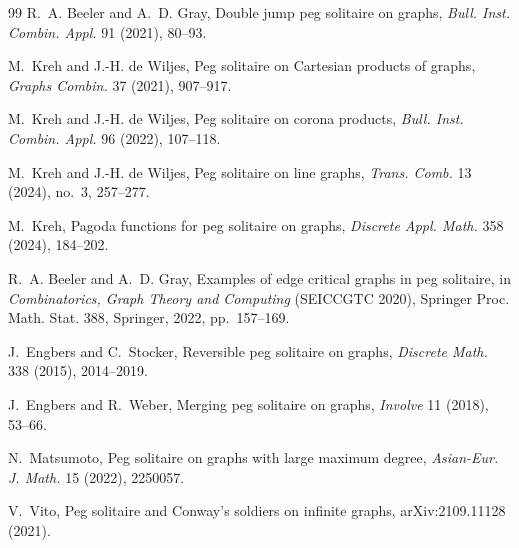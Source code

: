 \documentclass[11pt]{article}
\theoremstyle{definition}
\begin{document}
\begin{thebibliography}{99}
 R.~A. Beeler and A.~D. Gray, Double jump peg solitaire
on graphs, \emph{Bull. Inst. Combin. Appl.} 91 (2021), 80--93.

 M.~Kreh and J.-H. de Wiljes, Peg solitaire on
Cartesian products of graphs, \emph{Graphs Combin.} 37 (2021),
907--917.

 M.~Kreh and J.-H. de Wiljes, Peg solitaire on
corona products, \emph{Bull. Inst. Combin. Appl.} 96 (2022),
107--118.

 M.~Kreh and J.-H. de Wiljes, Peg solitaire on line
graphs, \emph{Trans. Comb.} 13 (2024), no.~3, 257--277.

 M.~Kreh, Pagoda functions for peg solitaire on
graphs, \emph{Discrete Appl. Math.} 358 (2024), 184--202.

 R.~A. Beeler and A.~D. Gray, Examples of edge
critical graphs in peg solitaire, in \emph{Combinatorics, Graph
Theory and Computing} (SEICCGTC 2020), Springer Proc. Math. Stat.
388, Springer, 2022, pp.~157--169.

 J.~Engbers and C.~Stocker, Reversible peg solitaire on
graphs, \emph{Discrete Math.} 338 (2015), 2014--2019.

 J.~Engbers and R.~Weber, Merging peg solitaire on graphs,
\emph{Involve} 11 (2018), 53--66.

 N.~Matsumoto, Peg solitaire on graphs with large maximum
degree, \emph{Asian-Eur. J. Math.} 15 (2022), 2250057.

 V.~Vito, Peg solitaire and Conway's soldiers on
infinite graphs, arXiv:2109.11128 (2021).

\end{thebibliography}
\end{document}
